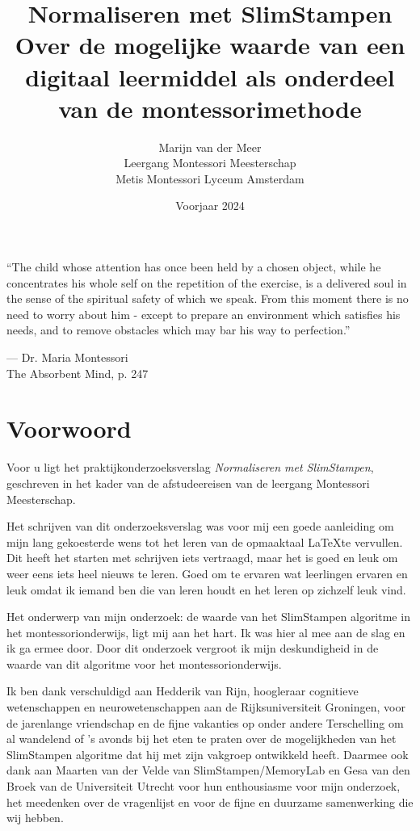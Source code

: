 \documentclass[12pt, a4paper]{article}
\title{Normaliseren met SlimStampen \\ \large Over de mogelijke waarde van een digitaal leermiddel als onderdeel van de montessorimethode}
\author{Marijn van der Meer\\ Leergang Montessori Meesterschap \\ Metis Montessori Lyceum Amsterdam}
\date{Voorjaar 2024}
\begin{document}
\maketitle
\thispagestyle{empty}
\pagebreak
\thispagestyle{empty}
\tableofcontents
\pagebreak
\thispagestyle{empty}
\epigraph{“The child whose attention has once been held by a chosen object, while he concentrates his whole self on the repetition of the exercise, is a delivered soul in the sense of the spiritual safety of which we speak. From this moment there is no need to worry about him - except to prepare an environment which satisfies his needs, and to remove obstacles which may bar his way to perfection.”}{--- \textup{Dr. Maria Montessori}\\ The Absorbent Mind, p. 247}
\pagebreak

\section*{Voorwoord}

Voor u ligt het praktijkonderzoeksverslag \emph{Normaliseren met SlimStampen}, geschreven in het kader van de afstudeereisen van de leergang Montessori Meesterschap.

Het schrijven van dit onderzoeksverslag was voor mij een goede aanleiding om mijn lang gekoesterde wens tot het leren van de opmaaktaal \LaTeX  te vervullen. Dit heeft het starten met schrijven iets vertraagd, maar het is goed en leuk om weer eens iets heel nieuws te leren. Goed om te ervaren wat leerlingen ervaren en leuk omdat ik iemand ben die van leren houdt en het leren op zichzelf leuk vind.

Het onderwerp van mijn onderzoek: de waarde van het SlimStampen algoritme in het montessorionderwijs, ligt mij aan het hart. Ik was hier al mee aan de slag en ik ga ermee door. Door dit onderzoek vergroot ik mijn deskundigheid in de waarde van dit algoritme voor het montessorionderwijs.

Ik ben dank verschuldigd aan Hedderik van Rijn, hoogleraar cognitieve wetenschappen en neurowetenschappen aan de Rijksuniversiteit Groningen, voor de jarenlange vriendschap en de fijne vakanties op onder andere Terschelling om al wandelend of 's avonds bij het eten te praten over de mogelijkheden van het SlimStampen algoritme dat hij met zijn vakgroep ontwikkeld heeft. Daarmee ook dank aan Maarten van der Velde van SlimStampen/MemoryLab en Gesa van den Broek van de Universiteit Utrecht voor hun enthousiasme voor mijn onderzoek, het meedenken over de vragenlijst en voor de fijne en duurzame samenwerking die wij hebben.
\end{document}
